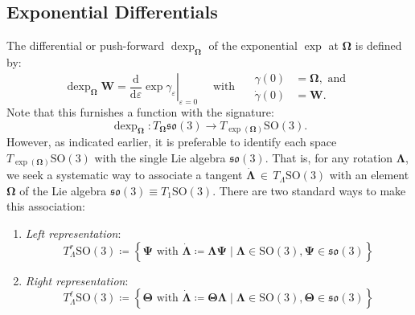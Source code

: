 \hypertarget{sec:exponential-differentials}{%
\subsection{Exponential Differentials}\label{sec:exponential-differentials}}

The differential or push-forward
\(\operatorname{dexp}_{\bm{\Omega}}\) of the exponential \(\exp\) at
\(\bm{\Omega}\)
is defined by: %
\begin{equation*} 
\operatorname{dexp}_{\bm{\Omega}} \bm{W} 
  =\left.\frac{\mathrm{d}}{\mathrm{d} \varepsilon} \exp  {\gamma_{\varepsilon}}\right|_{\varepsilon=0}
\quad\text{ with }\quad
\begin{aligned}
\gamma(0)&=\bm{\Omega}, \text{ and }\\
\dot{\gamma}(0)&=\bm{W} .
\end{aligned}
\end{equation*}
%
Note that this furnishes a function with the signature: %
\begin{equation*} 
\operatorname{dexp}_{\bm{\Omega}} : T_{\bm{\Omega}} \mathfrak{so}(3) \rightarrow T_{\exp ({\bm{\Omega}})} \mathrm{SO}(3).
\end{equation*}
However, as indicated earlier, it is %
preferable to identify each
space \(T_{\exp (\bm{\Omega})} \mathrm{SO}(3)\) with the single Lie
algebra \(\mathfrak{so}(3)\). That is, for any rotation \(\bm{\Lambda}\), we seek a systematic way to associate a tangent \(\dot{\bm{\Lambda}} \, \in \, T_{\scriptscriptstyle{\Lambda}} \mathrm{SO}(3)\) with an element \(\bm{\Omega}\) of the Lie algebra \(\mathfrak{so}(3) \equiv T_{1} \mathrm{SO}(3)\).
There are two standard ways to make this
association:

\begin{enumerate}
\def\labelenumi{\arabic{enumi}.}
\item
  \emph{Left representation}:%
  \begin{equation*} 
  T^{r}_{\scriptscriptstyle{\Lambda}} \mathrm{SO}(3) \coloneq \left\{
  \bm{\Psi}\text{ with }\dot{\bm{\Lambda}} \coloneq \bm{\Lambda} \bm{\Psi} \mid \bm{\Lambda} \in \mathrm{SO}(3), \bm{\Psi} \in \mathfrak{so}(3)\right\}
  \end{equation*}
 
\item
  \emph{Right representation}: %
\begin{equation}
    T^{\ell}_{\scriptscriptstyle{\Lambda}} \mathrm{SO}(3) \coloneq \left\{
   \bm{\Theta}\text{ with }\dot{\bm{\Lambda}} \coloneq \bm{\Theta} \bm{\Lambda} \mid \bm{\Lambda} \in \mathrm{SO}(3), \bm{\Theta} \in \mathfrak{so}(3)\right\}
   \label{eq:rTSO3}
    \end{equation}
 
\end{enumerate}

